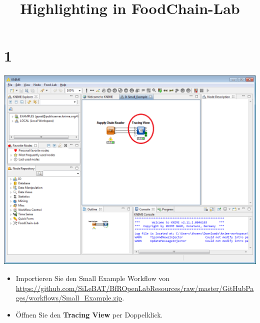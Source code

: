 \documentclass{beamer}
\title{Highlighting in FoodChain-Lab}
\date{}
\begin{document}
\maketitle
 
\section{1}
\begin{frame}
	\begin{center}
  		\includegraphics[height=0.6\textheight]{1.png}
	\end{center}
	\begin{itemize}
		\item Importieren Sie den Small Example Workflow von \url{https://github.com/SiLeBAT/BfROpenLabResources/raw/master/GitHubPages/workflows/Small_Example.zip}.
		\item Öffnen Sie den \textbf{Tracing View} per Doppelklick.
	\end{itemize}
\end{frame}
\end{document}
